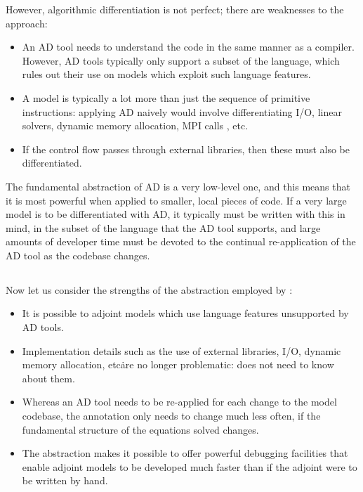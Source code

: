 However, algorithmic differentiation is not perfect; there are weaknesses to
the approach:
\begin{itemize}
\item An AD tool needs to understand the code in the same manner as a compiler.
However, AD tools typically only support a subset of the language, which rules
out their use on models which exploit such language features.
\item A model is typically a lot more than just the sequence of primitive instructions:
applying AD naively would involve differentiating I/O, linear solvers, dynamic
memory allocation, MPI calls \citep{utke2009}, etc.
\item If the control flow passes through external libraries, then these must also be
differentiated.
\end{itemize}

The fundamental abstraction of AD is a very low-level one, and this means that it is
most powerful when applied to smaller, local pieces of code. If a very large
model is to be differentiated with AD, it typically must be written with this in
mind, in the subset of the language that the AD tool supports, and large amounts
of developer time must be devoted to the continual re-application of the AD tool
as the codebase changes.

\subsection{\libadjoint}

Now let us consider the strengths of the abstraction employed by \libadjoint:
\begin{itemize}
\item It is possible to adjoint models which use language features unsupported 
by AD tools.
\item Implementation details such as the use of external libraries, I/O, dynamic
memory allocation, etc\. are no longer problematic: \libadjoint does not need to
know about them.
\item Whereas an AD tool needs to be re-applied for each change to the model
codebase, the \libadjoint annotation only needs to change much less often,
if the fundamental structure of the equations solved changes.
\item The abstraction makes it possible to offer powerful debugging facilities that enable adjoint models
to be developed much faster than if the adjoint were to be written by hand. %
\end{itemize}

